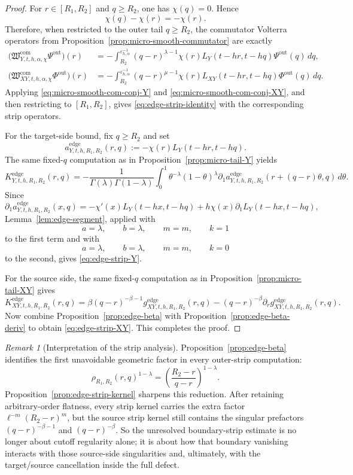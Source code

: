 \documentclass[11pt,a4paper]{amsart}
\theoremstyle{plain}
\theoremstyle{definition}
\theoremstyle{remark}
\newtheorem{remark}[theorem]{Remark}
\begin{document}
\begin{proof}
For \(r\in[R_1,R_2]\) and \(q\ge R_2\), one has \(\chi(q)=0\). Hence
\[
\chi(q)-\chi(r)=-\chi(r).
\]
Therefore, when restricted to the outer tail \(q\ge R_2\), the commutator Volterra operators from
Proposition~\ref{prop:micro-smooth-commutator} are exactly
\begin{align*}
\bigl(
\mathfrak W_{Y,t,h,\alpha,\chi}^{\mathrm{com}}\Psi^{\mathrm{out}}
\bigr)(r)
&=
-
\int_{R_2}^{\varepsilon_{h,\alpha}^{-1}}
(q-r)^{\lambda-1}
\chi(r)L_Y(t-hr,t-hq)\Psi^{\mathrm{out}}(q)\,dq,\\
\bigl(
\mathfrak W_{XY,t,h,\alpha,\chi}^{\mathrm{com}}\Phi^{\mathrm{out}}
\bigr)(r)
&=
-
\int_{R_2}^{\varepsilon_{h,\alpha}^{-1}}
(q-r)^{\mu-1}
\chi(r)L_{XY}(t-hr,t-hq)\Phi^{\mathrm{out}}(q)\,dq.
\end{align*}
Applying \eqref{eq:micro-smooth-com-conj-Y} and \eqref{eq:micro-smooth-com-conj-XY}, and then
restricting to \([R_1,R_2]\), gives \eqref{eq:edge-strip-identity} with the corresponding strip
operators.

For the target-side bound, fix \(q\ge R_2\) and set
\[
a_{Y,t,h,R_1,R_2}^{\mathrm{edge}}(r,q):=-\chi(r)L_Y(t-hr,t-hq).
\]
The same fixed-\(q\) computation as in Proposition~\ref{prop:micro-tail-Y} yields
\[
K_{Y,t,h,R_1,R_2}^{\mathrm{edge}}(r,q)
=
-
\frac{1}{\Gamma(\lambda)\Gamma(1-\lambda)}
\int_0^1
\theta^{-\lambda}(1-\theta)^\lambda
\partial_1 a_{Y,t,h,R_1,R_2}^{\mathrm{edge}}(r+(q-r)\theta,q)\,d\theta.
\]
Since
\[
\partial_1 a_{Y,t,h,R_1,R_2}^{\mathrm{edge}}(x,q)
=
-\chi'(x)L_Y(t-hx,t-hq)
+
h\chi(x)\partial_1L_Y(t-hx,t-hq),
\]
Lemma~\ref{lem:edge-segment}, applied with
\[
a=\lambda,\qquad b=\lambda,\qquad m=m,\qquad k=1
\]
to the first term and with
\[
a=\lambda,\qquad b=\lambda,\qquad m=m,\qquad k=0
\]
to the second, gives \eqref{eq:edge-strip-Y}.

For the source side, the same fixed-\(q\) computation as in Proposition~\ref{prop:micro-tail-XY}
gives
\[
K_{XY,t,h,R_1,R_2}^{\mathrm{edge}}(r,q)
=
\beta(q-r)^{-\beta-1}g_{XY,t,h,R_1,R_2}^{\mathrm{edge}}(r,q)
-
(q-r)^{-\beta}\partial_r g_{XY,t,h,R_1,R_2}^{\mathrm{edge}}(r,q).
\]
Now combine Proposition~\ref{prop:edge-beta} with Proposition~\ref{prop:edge-beta-deriv} to obtain
\eqref{eq:edge-strip-XY}. This completes the proof.
\end{proof}

\begin{remark}[Interpretation of the strip analysis]
\label{rem:edge-geometry}
Proposition~\ref{prop:edge-beta} identifies the first unavoidable geometric factor in every
outer-strip computation:
\[
\rho_{R_1,R_2}(r,q)^{1-\lambda}
=
\left(\frac{R_2-r}{q-r}\right)^{1-\lambda}.
\]
Proposition~\ref{prop:edge-strip-kernel} sharpens this reduction. After retaining arbitrary-order
flatness, every strip kernel carries the extra factor \(\ell^{-m}(R_2-r)^m\), but the source strip
kernel still contains the singular prefactors \((q-r)^{-\beta-1}\) and \((q-r)^{-\beta}\). So the
unresolved boundary-strip estimate is no longer about cutoff regularity alone; it is about how
that boundary vanishing interacts with those source-side singularities and, ultimately, with the
target/source cancellation inside the full defect.
\end{remark}
\end{document}
